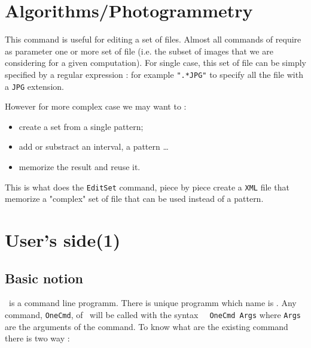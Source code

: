 
\section{Algorithms/Photogrammetry}

This command is useful for editing a set of files.
Almost all commands of \PPP require as parameter one or more set of 
file (i.e. the subset of images that we are considering for a given computation).
For single case, this set of file can be simply specified by a regular expression :
for example {\tt ".*JPG"} to specify all the file with a {\tt JPG} extension.

However for more complex case we may want to :

\begin{itemize}
   \item  create a set from a single pattern;
   \item  add or substract an interval, a pattern \dots
   \item  memorize the result and reuse it.
\end{itemize}


This is what does the  {\tt EditSet} command, piece by piece create a
{\tt XML} file that memorize a "complex" set of file that can be used
instead of a pattern.


\section{User's side(1)}


\subsection{Basic notion }

\PPP\, is a command line programm. There is unique programm which
name is \CdPPP. Any command, {\tt OneCmd}, of \PPP\, will be called with the 
syntax {\tt  \CdPPP\,  OneCmd Args} where {\tt Args} are the arguments
of the command. To know what are the existing command there is two way :

